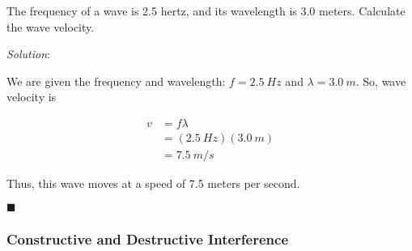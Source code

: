 \documentclass[dvipsnames]{article}
\begin{document}
\begin{example}
The frequency of a wave is 2.5 hertz, and its wavelength is 3.0 meters. Calculate the wave velocity.
\end{example}

\textit{Solution}: 

We are given the frequency and wavelength: $f = \SI{2.5}{Hz}$ and $\lambda = \SI{3.0}{m}$. So, wave velocity is

\begin{align*}
    v &= f \lambda \\[1ex]
    &= (\SI{2.5}{Hz})(\SI{3.0}{m}) \\[1ex]
    &= \boxed{\SI{7.5}{m/s}}
\end{align*}

Thus, this wave moves at a speed of 7.5 meters per second.

\hfill $\blacksquare$









\subsubsection{Constructive and Destructive Interference}
\end{document}
